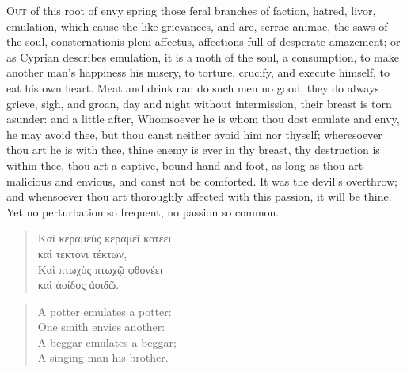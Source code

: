 {\lettrine{O}{ut} of this root of envy spring those feral branches of faction,
hatred, livor, emulation, which cause the like grievances, and are,
serrae animae, the saws of the soul, consternationis pleni
affectus, affections full of desperate amazement; or as Cyprian
describes emulation, it is a moth of the soul, a consumption, to
make another man's happiness his misery, to torture, crucify, and
execute himself, to eat his own heart. Meat and drink can do such men
no good, they do always grieve, sigh, and groan, day and night without
intermission, their breast is torn asunder: and a little after,
Whomsoever he is whom thou dost emulate and envy, he may avoid
thee, but thou canst neither avoid him nor thyself; wheresoever thou
art he is with thee, thine enemy is ever in thy breast, thy destruction
is within thee, thou art a captive, bound hand and foot, as long as
thou art malicious and envious, and canst not be comforted. It was the
devil's overthrow; and whensoever thou art thoroughly affected with
this passion, it will be thine. Yet no perturbation so frequent, no
passion so common.
%
\begin{verse}
\textgreek[variant=ancient]{Καὶ κεραμεὺς κεραμεῖ κοτέει\\
καὶ τεκτονι τέκτων},\\
\textgreek[variant=ancient]{Καὶ πτωχὸς πτωχῷ φθονέει\\
καὶ ἀοίδος ἀοιδῶ.}
\end{verse}
\translationrule
\begin{verse}
A potter emulates a potter:\\
One smith envies another:\\

A beggar emulates a beggar;\\
A singing man his brother.\\
\end{verse}

}
